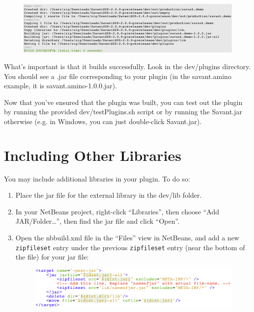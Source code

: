 \documentclass[times,11pt]{report}
\begin{document}
\begin{figure}[h!]
\begin{center}
\includegraphics[type=png,ext=.png,read=.png,width=15cm]{images/BuildOutput}
\end{center}
\end{figure}

What's important is that it builds successfully. Look in the dev/plugins directory. You should see a .jar file corresponding to your plugin (in the savant.amino example, it is savant.amino-1.0.0.jar).

Now that you've ensured that the plugin was built, you can test out the plugin by running the provided dev/testPlugins.sh script or by running the Savant.jar otherwise (e.g. in Windows, you can just double-click Savant.jar).
\section{Including Other Libraries}
You may include additional libraries in your plugin. To do so:
\begin{enumerate}
\item Place the jar file for the external library in the dev/lib folder.
\item In your NetBeans project, right-click ``Libraries'', then choose ``Add JAR/Folder\ldots'', then find the jar file and click ``Open''.
\item Open the nbbuild.xml file in the ``Files'' view in NetBeans, and add a new {\tt zipfileset} entry under the previous {\tt zipfileset} entry (near the bottom of the file) for your jar file:
\begin{figure}[h!]
\begin{center}
\includegraphics[type=png,ext=.png,read=.png,width=15cm]{images/ZipFileSet}
\end{center}
\end{figure}
\end{enumerate}
\end{document}
